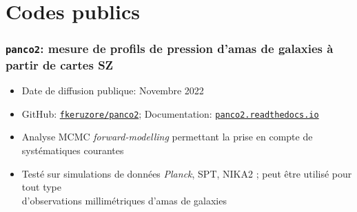 \section{Codes publics}

\subsubsection{\texttt{panco2}: mesure de profils de pression d'amas de galaxies à partir de cartes SZ}

\vspace{5pt}
\begin{itemize}[leftmargin=20pt]
    \setlength{\itemsep}{0pt}
    \item Date de diffusion publique: Novembre 2022
    \item GitHub: \href{https://github.com/fkeruzore/panco2}{\texttt{fkeruzore/panco2}}; Documentation: \href{https://panco2.readthedocs.io/en/latest/}{\texttt{panco2.readthedocs.io}}
    \item Analyse MCMC \textit{forward-modelling} permettant la prise en compte de systématiques courantes
    \item Testé sur simulations de données \textit{Planck}, SPT, NIKA2 ; peut être utilisé pour tout type \\ d'observations millimétriques d'amas de galaxies
\end{itemize} 

